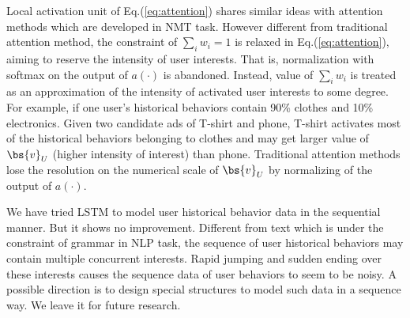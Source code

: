Local activation unit of Eq.(\ref{eq:attention}) shares similar ideas with attention methods which are developed in NMT task\cite{bengio:attention}.
However different from traditional attention method, the constraint of $\sum_i w_i = 1$ is relaxed in Eq.(\ref{eq:attention}), aiming to reserve the intensity of user interests. 
That is, normalization with softmax on the output of $a(\cdot)$ is abandoned.
Instead, value of $\sum_i w_i$ is treated as an approximation of the intensity of activated user interests to some degree.   
For example, if one user's historical behaviors contain 90\% clothes and 10\% electronics. 
Given two candidate ads of T-shirt and phone, T-shirt activates most of the historical behaviors belonging to clothes and may get larger value of $\bs{v}_U$ (higher intensity of interest) than phone. 
Traditional attention methods lose the resolution on the numerical scale of $\bs{v}_U$ by normalizing of the output of $a(\cdot)$. 



We have tried LSTM to model user historical behavior data in the sequential manner.
But it shows no improvement. 
Different from text which is under the constraint of grammar in NLP task, the sequence of user historical behaviors may contain multiple concurrent interests.
Rapid jumping and sudden ending over these interests causes the sequence data of user behaviors to seem to be noisy.
A possible direction is to design special structures to model such data in a sequence way.
We leave it for future research.  



